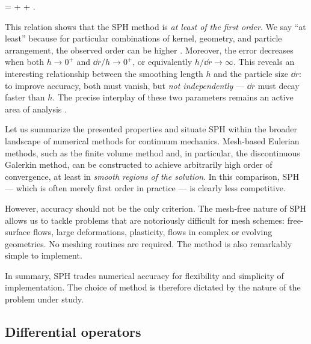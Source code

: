 \documentclass[../main.tex]{subfiles}
\begin{document}
\begin{equations}[single,!,numberline=all]
\label{eq:ERR}
\sphd{\Phi} = \Phi +  + .
\end{equations}

This relation shows that the SPH method is \emph{at least of the first order}. We say \enquote{at least} because for particular combinations of kernel, geometry, and particle arrangement, the observed order can be higher \autocite{quinlanTruncationErrorMeshfree2006}. 
Moreover, the error decreases when both $h \to 0^+$ and $\dd{r}/h \to 0^+$, or equivalently $h/\dd{r} \to \infty$. This reveals an interesting relationship between the smoothing length $h$ and the particle size $\dd{r}$: to improve accuracy, both must vanish, but \emph{not independently} --- $\dd{r}$ must decay faster than $h$. The precise interplay of these two parameters remains an active area of analysis \autocite{quinlanTruncationErrorMeshfree2006}.


Let us summarize the presented properties and situate SPH within the broader landscape of numerical methods for continuum mechanics. Mesh-based Eulerian methods, such as the finite volume method and, in particular, the discontinuous Galerkin method, can be constructed to achieve arbitrarily high order of convergence, at least in \emph{smooth regions of the solution}. In this comparison, SPH --- which is often merely first order in practice --- is clearly less competitive.

However, accuracy should not be the only criterion. The mesh-free nature of SPH allows us to tackle problems that are notoriously difficult for mesh schemes: free-surface flows, large deformations, plasticity, flows in complex or evolving geometries. No meshing routines are required. The method is also remarkably simple to implement.

In summary, SPH trades numerical accuracy for flexibility and simplicity of implementation. The choice of method is therefore dictated by the nature of the problem under study.

\subsection{Differential operators}
\label{sec:DIFF_OPS}
\end{document}
